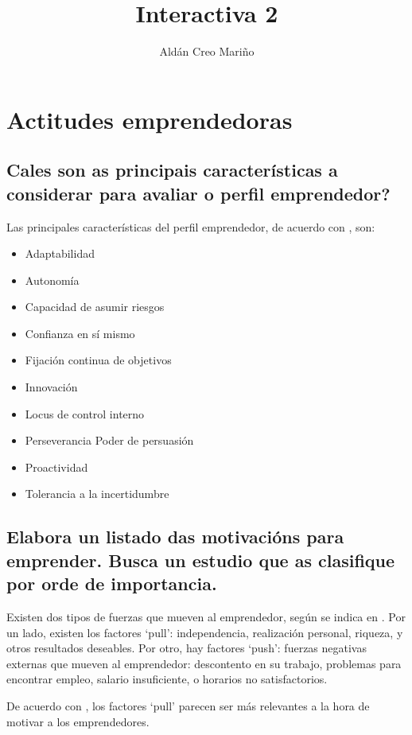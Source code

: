 \documentclass[a4paper]{article}
\title{Interactiva 2}
\author{Aldán Creo Mariño}
\begin{document}
\maketitle

\section{Actitudes emprendedoras}
\subsection{Cales son as principais características a considerar para avaliar o perfil emprendedor?}

Las principales características del perfil emprendedor, de acuerdo con \cite{RefWorks:doc:602fadc2c9e77c0001379bac}, son:

\begin{itemize}
    \item Adaptabilidad
    \item Autonomía
    \item Capacidad de asumir riesgos
    \item Confianza en sí mismo
    \item Fijación continua de objetivos
    \item Innovación
    \item Locus de control interno
    \item Perseverancia Poder de persuasión
    \item Proactividad
    \item Tolerancia a la incertidumbre
\end{itemize}

\subsection{Elabora un listado das motivacións para emprender. Busca un estudio que as clasifique por orde de importancia.}

Existen dos tipos de fuerzas que mueven al emprendedor, según se indica en \cite{RefWorks:doc:602fa427c9e77c0001379ab3}. Por un lado, existen los factores `pull': independencia, realización personal, riqueza, y otros resultados deseables. Por otro, hay factores `push': fuerzas negativas externas que mueven al emprendedor: descontento en su trabajo, problemas para encontrar empleo, salario insuficiente, o horarios no satisfactorios.

De acuerdo con \cite{RefWorks:doc:602fab10c9e77c0001379b54}, los factores `pull' parecen ser más relevantes a la hora de motivar a los emprendedores.
\end{document}
